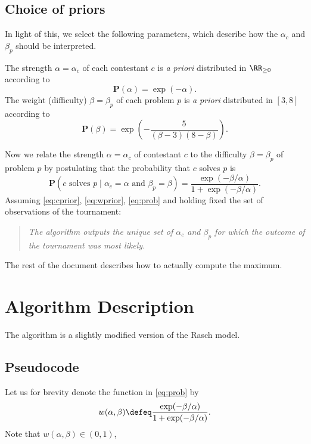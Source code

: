 \subsection{Choice of priors}
In light of this, we select the following parameters,
which describe how the $\alpha_c$ and $\beta_p$ should be interpreted.
\begin{itemize}
	\ii The strength $\alpha = \alpha_c$ of each contestant
	$c$ is \emph{a priori} distributed in $\RR_{\ge 0}$
	according to
	\begin{equation}
		\mathbf P(\alpha) = \exp(-\alpha).
		\label{eq:cprior}
	\end{equation}
	\ii The weight (difficulty) $\beta = \beta_p$ of each problem $p$ is
	\emph{a priori} distributed in $[3,8]$ according to 
	\begin{equation}
		\mathbf P(\beta) = \exp\left( -\frac{5}{(\beta-3)(8-\beta)} \right).
		\label{eq:wprior}
	\end{equation}
\end{itemize}
Now we relate the strength $\alpha = \alpha_c$ of contestant $c$
to the difficulty $\beta = \beta_p$ of problem $p$ by
postulating that the probability that $c$ solves $p$ is
\begin{equation}
	\mathbf P
	\left( \text{$c$ solves $p$} 
	\mid \alpha_c = \alpha \text{ and } \beta_p = \beta \right)
	= \frac{\exp(-\beta/\alpha)}{1 + \exp(-\beta/\alpha)}.
	\label{eq:prob}
\end{equation}
Assuming \eqref{eq:cprior}, \eqref{eq:wprior}, \eqref{eq:prob}
and holding fixed the set of observations of the tournament:
\begin{quote}
\itshape
The algorithm outputs the unique set of $\alpha_c$ and $\beta_p$
for which the outcome of the tournament was most likely.
\end{quote}
The rest of the document describes how to actually compute
the maximum.

\section{Algorithm Description}
The algorithm is a slightly modified version of the Rasch model.

\subsection{Pseudocode}
Let us for brevity denote the function in \eqref{eq:prob} by 
\[ w(\alpha, \beta) \defeq \frac{\exp(-\beta/\alpha)}{1 + \exp(-\beta/\alpha)}. \]
Note that $w(\alpha, \beta) \in (0,1)$,

